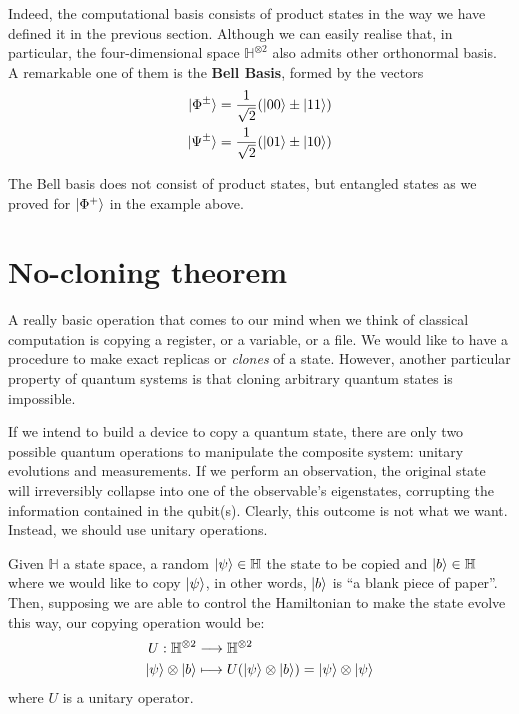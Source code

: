 Indeed, the computational basis consists of product states in the way we have defined it in the previous section. Although we can easily realise that, in particular, the four-dimensional space $\mathbb{H}^{\otimes 2}$ also admits other orthonormal basis. A remarkable one of them is the \textbf{Bell Basis}, formed by the vectors
\begin{align}
    \ket{\Phi^{\pm}} &= \frac{1}{\sqrt{2}}(\ket{00} \pm \ket{11}) \\
    \ket{\Psi^{\pm}} &= \frac{1}{\sqrt{2}}(\ket{01} \pm \ket{10})
\end{align}

The Bell basis does not consist of product states, but entangled states as we proved for $\ket{\Phi^{+}}$ in the example above. 

\section{No-cloning theorem}
A really basic operation that comes to our mind when we think of classical computation is copying a register, or a variable, or a file. We would like to have a procedure to make exact replicas or \textit{clones} of a state. However, another particular property of quantum systems is that cloning arbitrary quantum states is impossible. 

If we intend to build a device to copy a quantum state, there are only two possible quantum operations to manipulate the composite system: unitary evolutions and measurements. If we perform an observation, the original state will irreversibly collapse into one of the observable's eigenstates, corrupting the information contained in the qubit(s). Clearly, this outcome is not what we want. Instead, we should use unitary operations. 

Given $\mathbb{H}$ a state space, a random $\ket{\psi}\in \mathbb{H}$ the state to be copied and $\ket{b}\in \mathbb{H}$ where we would like to copy $\ket{\psi}$, in other words, $\ket{b}$ is ``a blank piece of paper''. Then, supposing we are able to control the Hamiltonian to make the state evolve this way, our copying operation would be:
\begin{align}
    U: \mathbb{H}^{\otimes 2} &\longrightarrow \mathbb{H}^{\otimes 2} \\
    \ket{\psi} \otimes \ket{b} &\longmapsto U(\ket{\psi} \otimes \ket{b}) = \ket{\psi} \otimes \ket{\psi}
\end{align}
where $U$ is a unitary operator.

